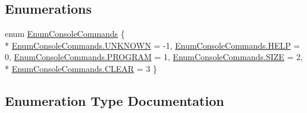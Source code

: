 \subsection*{Enumerations}
\begin{DoxyCompactItemize}
\item 
enum \hyperlink{namespace_c_p_u___o_s___simulator_1_1_console_a5d9f2366d41d3eb074f056be426272d7}{Enum\+Console\+Commands} \{ \\*
\hyperlink{namespace_c_p_u___o_s___simulator_1_1_console_a5d9f2366d41d3eb074f056be426272d7a696b031073e74bf2cb98e5ef201d4aa3}{Enum\+Console\+Commands.\+U\+N\+K\+N\+O\+W\+N} = -\/1, 
\hyperlink{namespace_c_p_u___o_s___simulator_1_1_console_a5d9f2366d41d3eb074f056be426272d7a4fc963e213bba362778f5c175eb4d5ff}{Enum\+Console\+Commands.\+H\+E\+L\+P} = 0, 
\hyperlink{namespace_c_p_u___o_s___simulator_1_1_console_a5d9f2366d41d3eb074f056be426272d7ac9c31422636176fa93724df8b6e3ef31}{Enum\+Console\+Commands.\+P\+R\+O\+G\+R\+A\+M} = 1, 
\hyperlink{namespace_c_p_u___o_s___simulator_1_1_console_a5d9f2366d41d3eb074f056be426272d7a62e5cef85d46f1a5a2144d9fd463b79e}{Enum\+Console\+Commands.\+S\+I\+Z\+E} = 2, 
\\*
\hyperlink{namespace_c_p_u___o_s___simulator_1_1_console_a5d9f2366d41d3eb074f056be426272d7a813461e0c58e7ad59a2fd83ca2237fec}{Enum\+Console\+Commands.\+C\+L\+E\+A\+R} = 3
 \}
\end{DoxyCompactItemize}


\subsection{Enumeration Type Documentation}
\hypertarget{namespace_c_p_u___o_s___simulator_1_1_console_a5d9f2366d41d3eb074f056be426272d7}{}
